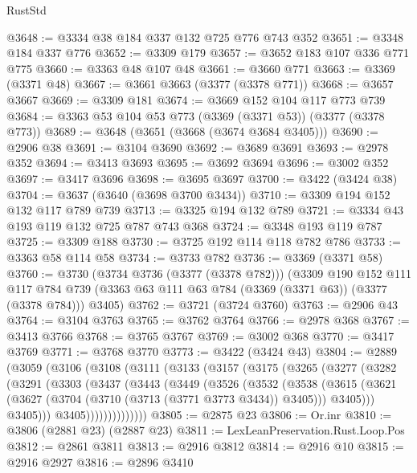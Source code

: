 \begin{lexlean}{RustStd}
\begin{coremodule}
@3648 := @3334 @38 @184 @337 @132 @725 @776 @743 @352
@3651 := @3348 @184 @337 @776
@3652 := @3309 @179
@3657 := @3652 @183 @107 @336 @771 @775
@3660 := @3363 @48 @107 @48
@3661 := @3660 @771
@3663 := @3369 (@3371 @48)
@3667 := @3661 @3663 (@3377 (@3378 @771))
@3668 := @3657 @3667
@3669 := @3309 @181
@3674 := @3669 @152 @104 @117 @773 @739
@3684 := @3363 @53 @104 @53 @773 (@3369 (@3371 @53)) (@3377 (@3378 @773))
@3689 := @3648 (@3651 (@3668 (@3674 @3684 @3405)))
@3690 := @2906 @38
@3691 := @3104 @3690
@3692 := @3689 @3691
@3693 := @2978 @352
@3694 := @3413 @3693
@3695 := @3692 @3694
@3696 := @3002 @352
@3697 := @3417 @3696
@3698 := @3695 @3697
@3700 := @3422 (@3424 @38)
@3704 := @3637 (@3640 (@3698 @3700 @3434))
@3710 := @3309 @194 @152 @132 @117 @789 @739
@3713 := @3325 @194 @132 @789
@3721 := @3334 @43 @193 @119 @132 @725 @787 @743 @368
@3724 := @3348 @193 @119 @787
@3725 := @3309 @188
@3730 := @3725 @192 @114 @118 @782 @786
@3733 := @3363 @58 @114 @58
@3734 := @3733 @782
@3736 := @3369 (@3371 @58)
@3760 := @3730
    (@3734 @3736 (@3377 (@3378 @782)))
    (@3309
      @190
      @152
      @111
      @117
      @784
      @739
      (@3363 @63 @111 @63 @784 (@3369 (@3371 @63)) (@3377 (@3378 @784)))
      @3405)
@3762 := @3721 (@3724 @3760)
@3763 := @2906 @43
@3764 := @3104 @3763
@3765 := @3762 @3764
@3766 := @2978 @368
@3767 := @3413 @3766
@3768 := @3765 @3767
@3769 := @3002 @368
@3770 := @3417 @3769
@3771 := @3768 @3770
@3773 := @3422 (@3424 @43)
@3804 := @2889
    (@3059
      (@3106
        (@3108
          (@3111
            (@3133
              (@3157
                (@3175
                  (@3265
                    (@3277
                      (@3282
                        (@3291
                          (@3303
                            (@3437
                              (@3443
                                (@3449
                                  (@3526
                                    (@3532
                                      (@3538
                                        (@3615
                                          (@3621
                                            (@3627
                                              (@3704 (@3710 (@3713 (@3771 @3773 @3434)) @3405)))
                                            @3405)))
                                      @3405)))
                                @3405))))))))))))))
@3805 := @2875 @23
@3806 := Or.inr
@3810 := @3806 (@2881 @23) (@2887 @23)
@3811 := LexLeanPreservation.Rust.Loop.Pos
@3812 := @2861 @3811
@3813 := @2916 @3812
@3814 := @2916 @10
@3815 := @2916 @2927
@3816 := @2896 @3410

\end{coremodule}
\end{lexlean}
